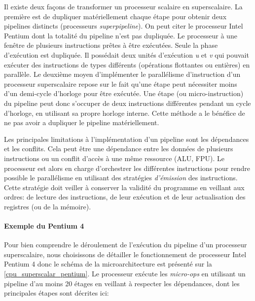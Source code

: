             Il existe deux façons de transformer un processeur scalaire en superscalaire. La première est de dupliquer matériellement chaque étape pour obtenir deux pipelines distincts (processeurs \textit{superpipeline}). On peut citer le processeur Intel Pentium dont la totalité du pipeline n'est pas dupliquée. Le processeur à une fenêtre de plusieurs instructions prêtes à être exécutées. Seule la phase d'exécution est dupliquée.  Il possédait deux unités d'exécution \textit{u} et \textit{v} qui pouvait exécuter des instructions de types différents (opérations flottantes ou entières) en parallèle. 
            Le deuxième moyen d'implémenter le parallélisme d'instruction d'un processeur superscalaire repose sur le fait qu'une étape peut nécessiter moins d'un demi-cycle d'horloge pour être exécutée. Une étape (ou micro-instruction) du pipeline peut donc s'occuper de deux instructions différentes pendant un cycle d'horloge, en utilisant sa propre horloge interne. Cette méthode a le bénéfice de ne pas avoir a dupliquer le pipeline matériellement. 
            
            Les principales limitations à l'implémentation d'un pipeline sont les dépendances et les conflits. Cela peut être une dépendance entre les données de plusieurs instructions ou un conflit d'accès à une même ressource (ALU, FPU). Le processeur est alors en charge d'orchestrer les différentes instructions pour rendre possible le parallélisme en utilisant des stratégies \textit{d'émission} \cite{johnson1989super} des instructions. Cette stratégie doit veiller à conserver la validité du programme en veillant aux ordres: de lecture des instructions, de leur exécution et de leur actualisation des registres (ou de la mémoire). 
        
        
        \paragraph{Exemple du Pentium 4}\label{sec:alu_pentium}
        
            Pour bien comprendre le déroulement de l'exécution du pipeline d'un processeur superscalaire, nous choisissons de détailler le fonctionnement de processeur Intel Pentium 4 \cite{stallings2003organisation} donc le schéma de la microarchitecture est présenté sur la \autoref{cpu_superscalar_pentium}. Le processeur exécute les \textit{micro-ops} en utilisant un pipeline d'au moins 20 étages en veillant à respecter les dépendances, dont les principales étapes sont décrites ici: 
            
